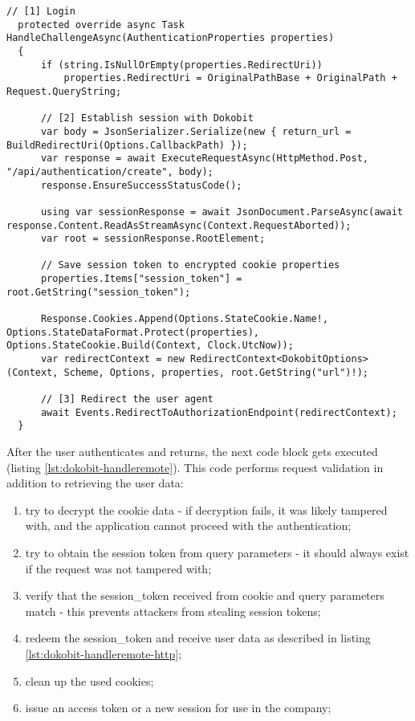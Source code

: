 \begin{lstlisting}[caption={Handling Dokobit session creation}, label={lst:dokobit-challenge}]
  // [1] Login
  protected override async Task HandleChallengeAsync(AuthenticationProperties properties)
  {
      if (string.IsNullOrEmpty(properties.RedirectUri))
          properties.RedirectUri = OriginalPathBase + OriginalPath + Request.QueryString;

      // [2] Establish session with Dokobit
      var body = JsonSerializer.Serialize(new { return_url = BuildRedirectUri(Options.CallbackPath) });
      var response = await ExecuteRequestAsync(HttpMethod.Post, "/api/authentication/create", body);
      response.EnsureSuccessStatusCode();

      using var sessionResponse = await JsonDocument.ParseAsync(await response.Content.ReadAsStreamAsync(Context.RequestAborted));
      var root = sessionResponse.RootElement;

      // Save session token to encrypted cookie properties
      properties.Items["session_token"] = root.GetString("session_token");

      Response.Cookies.Append(Options.StateCookie.Name!, Options.StateDataFormat.Protect(properties), Options.StateCookie.Build(Context, Clock.UtcNow));
      var redirectContext = new RedirectContext<DokobitOptions>(Context, Scheme, Options, properties, root.GetString("url")!);

      // [3] Redirect the user agent
      await Events.RedirectToAuthorizationEndpoint(redirectContext);
  }
\end{lstlisting}

After the user authenticates and returns, the next code block gets executed (listing \ref{lst:dokobit-handleremote}). This code performs request validation in addition to retrieving the user data:

\begin{enumerate}
  \item try to decrypt the cookie data - if decryption fails, it was likely tampered with, and the application cannot proceed with the authentication;
  \item try to obtain the session token from query parameters - it should always exist if the request was not tampered with;
  \item verify that the session\_token received from cookie and query parameters match - this prevents attackers from stealing session tokens;
  \item redeem the session\_token and receive user data as described in listing \ref{lst:dokobit-handleremote-http};
  \item clean up the used cookies;
  \item issue an access token or a new session for use in the company;
\end{enumerate}

